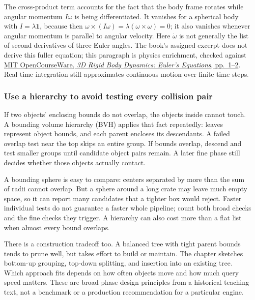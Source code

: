 The cross-product term accounts for the fact that the body frame rotates while angular momentum \(I\omega\) is being differentiated. It vanishes for a spherical body with \(I=\lambda\mathbf{1}\), because then \(\omega\times(I\omega)=\lambda(\omega\times\omega)=0\); it also vanishes whenever angular momentum is parallel to angular velocity. Here \(\dot{\omega}\) is not generally the list of second derivatives of three Euler angles. The book's assigned excerpt does not derive this fuller equation; this paragraph is physics enrichment, checked against \href{https://ocw.mit.edu/courses/16-07-dynamics-fall-2009/5e1d8699338146e5127080b880b906d6_MIT16_07F09_Lec28.pdf}{MIT OpenCourseWare, \emph{3D Rigid Body Dynamics: Euler's Equations}, pp.~1--2}. Real-time integration still approximates continuous motion over finite time steps.

\subsubsection{Use a hierarchy to avoid testing every collision pair}\label{06-engine-ii-ch033-use-a-hierarchy-to-avoid-testing-every-collision-pair}

\hypertarget{06-engine-ii-ch033-use-a-hierarchy-to-avoid-testing-every-collision-pair}{}

If two objects' enclosing bounds do not overlap, the objects inside cannot touch. A bounding volume hierarchy (BVH) applies that fact repeatedly: leaves represent object bounds, and each parent encloses its descendants. A failed overlap test near the top skips an entire group. If bounds overlap, descend and test smaller groups until candidate object pairs remain. A later fine phase still decides whether those objects actually contact.

A bounding sphere is easy to compare: centers separated by more than the sum of radii cannot overlap. But a sphere around a long crate may leave much empty space, so it can report many candidates that a tighter box would reject. Faster individual tests do not guarantee a faster whole pipeline; count both broad checks and the fine checks they trigger. A hierarchy can also cost more than a flat list when almost every bound overlaps.

There is a construction tradeoff too. A balanced tree with tight parent bounds tends to prune well, but takes effort to build or maintain. The chapter sketches bottom-up grouping, top-down splitting, and insertion into an existing tree. Which approach fits depends on how often objects move and how much query speed matters. These are broad phase design principles from a historical teaching text, not a benchmark or a production recommendation for a particular engine.


